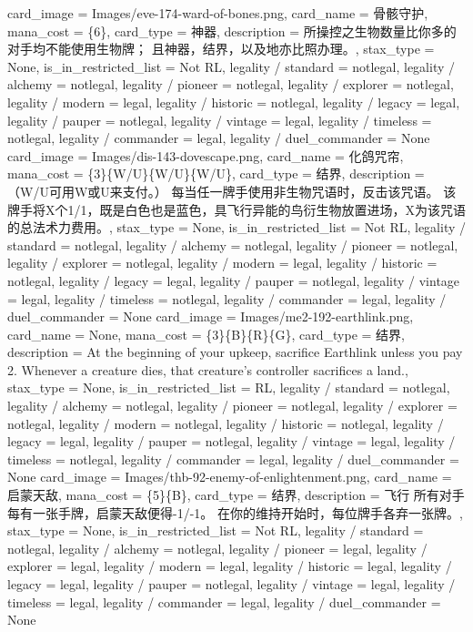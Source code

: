 \documentclass[lang = cn, color = black, 10pt]{AllThatStax}
\begin{document}
\card
{
	card_image = Images/eve-174-ward-of-bones.png,
	card_name = 骨骸守护,
	mana_cost = \{6\},
	card_type = 神器,
	description = 所操控之生物数量比你多的对手均不能使用生物牌； 且神器，结界，以及地亦比照办理。,
	stax_type = None,
	is_in_restricted_list = Not RL,
	legality / standard = notlegal,
	legality / alchemy = notlegal,
	legality / pioneer = notlegal,
	legality / explorer = notlegal,
	legality / modern = legal,
	legality / historic = notlegal,
	legality / legacy = legal,
	legality / pauper = notlegal,
	legality / vintage = legal,
	legality / timeless = notlegal,
	legality / commander = legal,
	legality / duel_commander = None
}
\card
{
	card_image = Images/dis-143-dovescape.png,
	card_name = 化鸽咒帘,
	mana_cost = \{3\}\{W/U\}\{W/U\}\{W/U\},
	card_type = 结界,
	description = （{W/U}可用{W}或{U}来支付。）
	每当任一牌手使用非生物咒语时，反击该咒语。 该牌手将X个1/1，既是白色也是蓝色，具飞行异能的鸟衍生物放置进场，X为该咒语的总法术力费用。,
	stax_type = None,
	is_in_restricted_list = Not RL,
	legality / standard = notlegal,
	legality / alchemy = notlegal,
	legality / pioneer = notlegal,
	legality / explorer = notlegal,
	legality / modern = legal,
	legality / historic = notlegal,
	legality / legacy = legal,
	legality / pauper = notlegal,
	legality / vintage = legal,
	legality / timeless = notlegal,
	legality / commander = legal,
	legality / duel_commander = None
}
\card
{
	card_image = Images/me2-192-earthlink.png,
	card_name = None,
	mana_cost = \{3\}\{B\}\{R\}\{G\},
	card_type = 结界,
	description = At the beginning of your upkeep, sacrifice Earthlink unless you pay {2}.
	Whenever a creature dies, that creature's controller sacrifices a land.,
	stax_type = None,
	is_in_restricted_list = RL,
	legality / standard = notlegal,
	legality / alchemy = notlegal,
	legality / pioneer = notlegal,
	legality / explorer = notlegal,
	legality / modern = notlegal,
	legality / historic = notlegal,
	legality / legacy = legal,
	legality / pauper = notlegal,
	legality / vintage = legal,
	legality / timeless = notlegal,
	legality / commander = legal,
	legality / duel_commander = None
}
\card
{
	card_image = Images/thb-92-enemy-of-enlightenment.png,
	card_name = 启蒙天敌,
	mana_cost = \{5\}\{B\},
	card_type = 结界,
	description = 飞行
	所有对手每有一张手牌，启蒙天敌便得-1/-1。
	在你的维持开始时，每位牌手各弃一张牌。,
	stax_type = None,
	is_in_restricted_list = Not RL,
	legality / standard = notlegal,
	legality / alchemy = notlegal,
	legality / pioneer = legal,
	legality / explorer = legal,
	legality / modern = legal,
	legality / historic = legal,
	legality / legacy = legal,
	legality / pauper = notlegal,
	legality / vintage = legal,
	legality / timeless = legal,
	legality / commander = legal,
	legality / duel_commander = None
}
\end{document}

